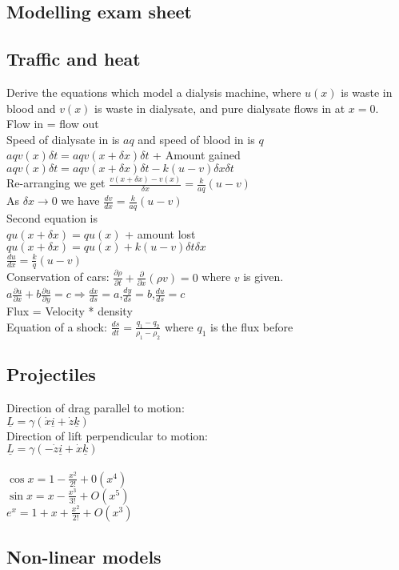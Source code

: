 \documentclass[1pt]{article}
\begin{document}
\begin{center}
\section*{Modelling exam sheet}
\end{center}



\subsection*{Traffic and heat}
Derive the equations which model a dialysis machine, where $u(x)$ is waste in blood and $v(x)$ is waste in dialysate, and pure dialysate flows in at $x=0$.
\\Flow in = flow out
\\ Speed of dialysate in is $aq$ and speed of blood in is $q$ 
\\ $aqv(x)\delta t = aqv(x+\delta x)\delta t$ + Amount gained 
\\ $aqv(x)\delta t = aqv(x+\delta x)\delta t - k(u-v)\delta x \delta t$
\\Re-arranging we get $\frac{v(x+\delta x) - v(x)}{\delta x}=\frac{k}{aq}(u-v)$
\\ As $\delta x \longrightarrow 0$ we have $\frac{dv}{dx}=\frac{k}{aq}(u-v)$
\\ Second equation is 
\\ $qu(x+\delta x)=qu(x)$ + amount lost
\\ $qu(x+\delta x)=qu(x)+k(u-v)\delta t \delta x$
\\ $\frac{du}{dx}=\frac{k}{q}(u-v)$
\\ Conservation of cars: $\frac{\partial \rho}{\partial t}+\frac{\partial}{\partial x}(\rho v)=0$ where $v$ is given.
\\$a\frac{\partial u}{\partial x}+b\frac{\partial u}{\partial y}=c \Rightarrow \frac{dx}{ds}=a$,$\frac{dy}{ds}=b$,$\frac{du}{ds}=c$
\\ Flux = Velocity * density
\\ Equation of a shock: $\frac{ds}{dt}=\frac{q_1-q_2}{\rho_1-\rho_2}$ where $q_1$ is the flux before
\subsection*{Projectiles}
Direction of drag parallel to motion: 
\\$\underline{L}=\gamma(\dot{x}\underline{i}+\dot{z}\underline{k})$
\\Direction of lift perpendicular to motion:
\\
$\underline{L}=\gamma(-\dot{z}\underline{i}+\dot{x}\underline{k})$
\\
\\$\cos x = 1 - \frac{x^2}{2!}+0(x^4)$
\\$\sin x = x-\frac{x^3}{3!}+O(x^5)$
\\$e^x=1+x+\frac{x^2}{2!}+O(x^3)$

\subsection*{Non-linear models}
\end{document}
